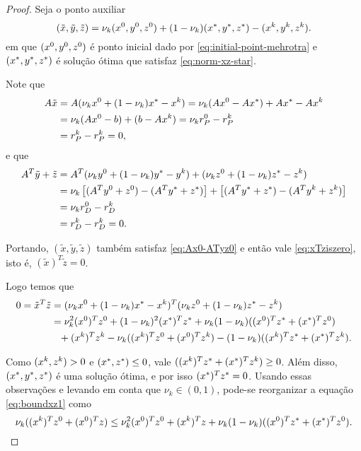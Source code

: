 \begin{proof}
	Seja o ponto auxiliar
	\[
		(\tilde{x},\tilde{y},\tilde{z})  = \nu_k(x^0,y^0,z^0) + (1-\nu_k)(x^*,y^*,z^*) - (x^{k},y^{k},z^{k}). 
	\]
em que $(x^0,y^0,z^0)$ é ponto inicial dado por \eqref{eq:initial-point-mehrotra} e $(x^*,y^*,z^*)$ é  solução ótima que satisfaz \eqref{eq:norm-xz-star}.


Note que 
\[
\begin{aligned}
A\tilde{x} & = A(\nu_kx^0+ (1-\nu_k)x^* -x^{k}) = \nu_k(Ax^0 - Ax^*) + Ax^* - Ax^{k}   \\
& = \nu_k(Ax^0 - b) + (b - Ax^{k}) = \nu_k r_{P}^{0} - r_{P}^{k}  \\
 & = r_{P}^{k} - r_{P}^{k} = 0,  
\end{aligned}
\]
e que
\[
\begin{aligned}
A^{T}\tilde{y} + \tilde{z}  & = 	A^{T}(\nu_ky^0 + (1-\nu_k)y^* - y^{k}) + (\nu_kz^0 + (1-\nu_k)z^* - z^{k}) \\
							&  =  \nu_k \left[(A^{T}y^0  +z^0)  - (A^{T}y^*  +z^*)  \right]+  \left[(A^{T}y^*  +z^*)  - (A^{T}y^{k}  +z^{k})  \right]  \\
							& = \nu_k r_{D}^{0} - r_{D}^{k}  \\
 & = r_{D}^{k} - r_{D}^{k} = 0.   
\end{aligned}
\]


Portando, $(\tilde{x},\tilde{y},\tilde{z})$ também satisfaz \eqref{eq:Ax0-ATyz0} e então vale \eqref{eq:xTziszero}, isto é, $(\tilde{x})^{T}\tilde{z} = 0$. 

Logo temos que 
\begin{align}
	0  = \tilde{x}^{T}\tilde{z} & = (\nu_k\xzero + (1-\nu_k)\xstar -\xk)^{T}(\nu_k\zzero + (1-\nu_k)\zstar -\zk)\notag\\
	  & = \nu_k^{2}(\xzero)^T\zzero + (1-\nu_k)^{2}(\xstar)^{T}\zstar + \nu_k(1-\nu_k)((\xzero)^{T}\zstar + (\xstar)^{T}\zzero) \notag\\
	  & \textcolor{white}{=} +(\xk)^{T}\zk - \nu_k ((\xk)^{T}\zzero + (\xzero)^{T}\zk) - (1-\nu_k) ((\xk)^{T}\zstar + (\xstar)^{T}\zk).\label{eq:boundxz1}
\end{align}

Como  $(x^{k},z^{k})>0$ e $(x^*,z^*)\leq 0$, vale $((x^{k})^{T}z^* + (x^*)^{T}z^{k}) \geq 0$. Além disso, $(x^*,y^*,z^*)$ é uma solução ótima, e por isso $(x^*)^{T}z^* = 0$. Usando essas observações e levando em conta que $\nu_k\in(0,1)$,  pode-se reorganizar  a equação \eqref{eq:boundxz1} como
\begin{equation}
	\label{eq:xTzero+xzeroTz}
	  \nu_k ((x^{k})^{T}z^0 + (x^0)^{T}z) \leq 
  \nu_k^{2}(x^0)^Tz^0  + (x^{k})^{T}z+  \nu_k(1-\nu_k)((x^0)^{T}z^* + (x^*)^{T}z^0).
\end{equation}


\end{proof}
